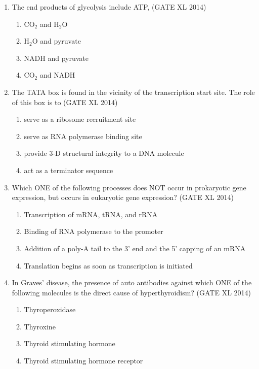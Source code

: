 \documentclass[journal,12pt,onecolumn]{IEEEtran}
\theoremstyle{remark}
\begin{document}
\begin{enumerate}
\item The end products of glycolysis include ATP, \hfill(GATE XL 2014)\\
\begin{multicols}{2}
\begin{enumerate}
\item CO$_{2}$ and H$_{2}$O
\item H$_{2}$O and pyruvate
\item NADH and pyruvate
\item CO$_{2}$ and NADH
\end{enumerate}
\end{multicols}

\item The TATA box is found in the vicinity of the transcription start site. The role of this box is to \hfill(GATE XL 2014)\\
\begin{multicols}{2}
\begin{enumerate}
\item serve as a ribosome recruitment site
\item serve as RNA polymerase binding site
\item provide 3-D structural integrity to a DNA molecule
\item act as a terminator sequence
\end{enumerate}
\end{multicols}

\item Which ONE of the following processes does NOT occur in prokaryotic gene expression, but occurs in eukaryotic gene expression? \hfill(GATE XL 2014)\\
\begin{multicols}{2}
\begin{enumerate}
\item Transcription of mRNA, tRNA, and rRNA
\item Binding of RNA polymerase to the promoter
\item Addition of a poly-A tail to the 3' end and the 5' capping of an mRNA
\item Translation begins as soon as transcription is initiated
\end{enumerate}
\end{multicols}

\item In Graves’ disease, the presence of auto antibodies against which ONE of the following molecules is the direct cause of hyperthyroidism? \hfill(GATE XL 2014)\\
\begin{multicols}{2}
\begin{enumerate}
\item Thyroperoxidase
\item Thyroxine
\item Thyroid stimulating hormone
\item Thyroid stimulating hormone receptor
\end{enumerate}
\end{multicols}


\end{enumerate}
\end{document}
